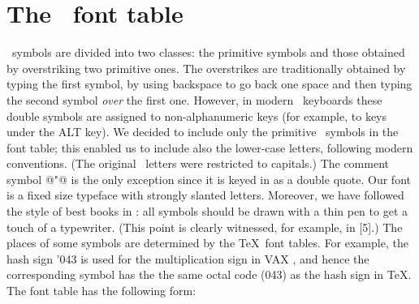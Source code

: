 \section{The \APL\ font table}
\APL\ symbols are divided into two classes: the primitive symbols
and those obtained by overstriking two primitive ones. The overstrikes
are traditionally obtained by typing the first symbol, by using
backspace to go back one space and then typing the second symbol
{\sl over\/} the first one. However, in modern \APL\ keyboards these
double symbols are assigned to non-alphanumeric keys (for example,
to keys under the {\sltt ALT\/} key). We decided to include only the
primitive \APL\ symbols in the font table; this enabled us to include
also the lower-case letters, following modern conventions. (The original
\APL\ letters were restricted to capitals.) The comment symbol
@"@ is the only exception since it is keyed in as a double quote.
Our font is a fixed size typeface with strongly slanted letters.
Moreover, we have followed the style of best books in \APL:
all symbols should be drawn with a thin pen to get a touch of
a typewriter. (This point is clearly witnessed, for example, in [5].)
The places of some symbols are determined by the \TeX\ font tables.
For example, the hash sign {\sltt\char'043\/} is used for the
multiplication sign in VAX \APL, and hence the corresponding symbol
has the the same octal code (043) as the hash sign in \TeX.
The font table has the following form:          %

